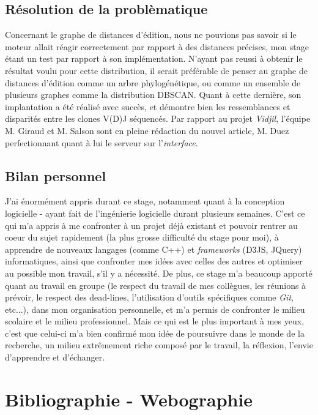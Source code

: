\documentclass[pdftex,12pt,a4paper]{report}
\begin{document}
\begin{spacing}{1.2}

\section*{Résolution de la problèmatique}

Concernant le graphe de distances d'édition, nous ne pouvions pas savoir si le moteur allait réagir correctement par rapport à des distances précises, mon stage étant un test par rapport à son implémentation. N'ayant pas reussi à obtenir le résultat voulu pour cette distribution, il serait préférable de penser au graphe de distances d'édition comme un arbre phylogénétique, ou comme un ensemble de plusieurs graphes comme la distribution DBSCAN. Quant à cette dernière, son implantation a été réalisé avec succès, et démontre bien les ressemblances et disparités entre les clones V(D)J séquencés. Par rapport au projet \textit{Vidjil}, l'équipe M. Giraud et M. Salson sont en pleine rédaction du nouvel article, M. Duez perfectionnant quant à lui le serveur sur l'\textit{interface}.

\section*{Bilan personnel}

J'ai énormément appris durant ce stage, notamment quant à la conception logicielle - ayant fait de l'ingénierie logicielle durant plusieurs semaines. C'est ce qui m'a appris à me confronter à un projet déjà existant et pouvoir rentrer au coeur du sujet rapidement (la plus grosse difficulté du stage pour moi), à apprendre de nouveaux langages (comme C++) et \textit{frameworks} (D3JS, JQuery) informatiques, ainsi que confronter mes idées avec celles des autres et optimiser au possible mon travail, s'il y a nécessité. De plus, ce stage m'a beaucoup apporté quant au travail en groupe (le respect du travail de mes collègues, les réunions à prévoir, le respect des dead-lines, l'utilisation d'outils spécifiques comme \textit{Git}, etc...), dans mon organisation personnelle, et m'a permis de confronter le milieu scolaire et le milieu professionnel.
Mais ce qui est le plus important à mes yeux, c'est que celui-ci m'a bien confirmé mon idée de poursuivre dans le monde de la recherche, un milieu extrêmement riche composé par le travail, la réflexion, l'envie d'apprendre et d'échanger.

\chapter*{Bibliographie - Webographie}


\end{spacing}
\end{document}
